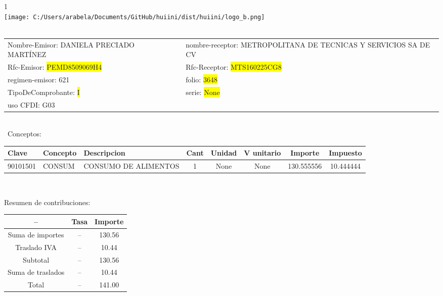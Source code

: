 \documentclass{article}
\begin{document}
\hspace{18cm} 1\\
\texttt{[image: C:/Users/arabela/Documents/GitHub/huiini/dist/huiini/logo\_b.png]}
\bigskip\\\
\begin{tabular}{p{11cm}p{1cm}p{8cm}}

Nombre-Emisor: DANIELA PRECIADO MARTÍNEZ && nombre-receptor: METROPOLITANA DE TECNICAS Y SERVICIOS SA DE CV\\

Rfc-Emisor: \colorbox{yellow}{ PEMD8509069H4 } & & Rfc-Receptor: \colorbox{yellow}{ MTS160225CG8 }\\

regimen-emisor: 621 & & folio: \colorbox{yellow}{ 3648 }\\

TipoDeComprobante: \colorbox{yellow}{ I } & & serie: \colorbox{yellow}{ None }\\

uso CFDI: G03\\



\end{tabular}
\bigskip\bigskip\bigskip\\\
Conceptos:\\
\begin{tabular}{|p{1.5cm}|p{3.6cm}|p{3.6cm}|c|c|c|c|c|}
\hline
Clave & Concepto & Descripcion & Cant & Unidad & V unitario & Importe & Impuesto \\
\hline

90101501 & CONSUM & CONSUMO DE ALIMENTOS & 1 & None & None & 130.555556 &  10.444444 \\
\hline

\end{tabular}\\
\bigskip
\begin{center}
Resumen de contribuciones:\\
\bigskip
\begin{tabular}{|c|c|c|}
\hline
 -- & Tasa & Importe\\
\hline

Suma de importes & -- & 130.56 \\
\hline

Traslado IVA & -- & 10.44 \\
\hline

Subtotal  & -- & 130.56 \\
\hline

Suma de traslados & -- & 10.44 \\
\hline

Total  & -- & 141.00 \\
\hline

\end{tabular}
\end{center}
\end{document}
